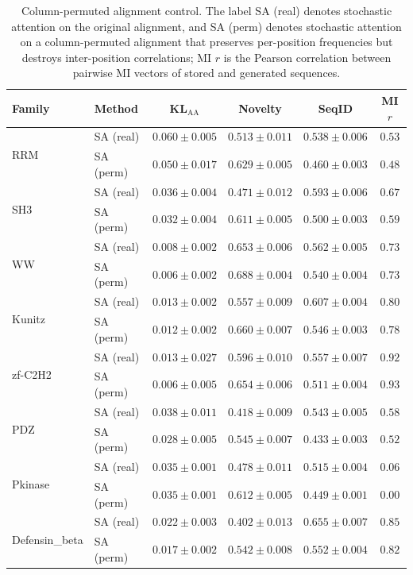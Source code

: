 \begin{table}[ht]
\centering
\caption{Column-permuted alignment control. The label SA (real) denotes stochastic attention on the original alignment, and SA (perm) denotes stochastic attention on a column-permuted alignment that preserves per-position frequencies but destroys inter-position correlations; MI $r$ is the Pearson correlation between pairwise MI vectors of stored and generated sequences.}
\label{tab:permuted-alignment}
\small
\begin{tabular}{@{}llcccc@{}}
\toprule
Family & Method & KL$_{\mathrm{AA}}$ & Novelty & SeqID & MI $r$ \\
\midrule
\multirow{2}{*}{RRM}
 & SA (real) & $0.060 \pm 0.005$ & $0.513 \pm 0.011$ & $0.538 \pm 0.006$ & $0.53$ \\
 & SA (perm) & $0.050 \pm 0.017$ & $0.629 \pm 0.005$ & $0.460 \pm 0.003$ & $0.48$ \\
\midrule
\multirow{2}{*}{SH3}
 & SA (real) & $0.036 \pm 0.004$ & $0.471 \pm 0.012$ & $0.593 \pm 0.006$ & $0.67$ \\
 & SA (perm) & $0.032 \pm 0.004$ & $0.611 \pm 0.005$ & $0.500 \pm 0.003$ & $0.59$ \\
\midrule
\multirow{2}{*}{WW}
 & SA (real) & $0.008 \pm 0.002$ & $0.653 \pm 0.006$ & $0.562 \pm 0.005$ & $0.73$ \\
 & SA (perm) & $0.006 \pm 0.002$ & $0.688 \pm 0.004$ & $0.540 \pm 0.004$ & $0.73$ \\
\midrule
\multirow{2}{*}{Kunitz}
 & SA (real) & $0.013 \pm 0.002$ & $0.557 \pm 0.009$ & $0.607 \pm 0.004$ & $0.80$ \\
 & SA (perm) & $0.012 \pm 0.002$ & $0.660 \pm 0.007$ & $0.546 \pm 0.003$ & $0.78$ \\
\midrule
\multirow{2}{*}{zf-C2H2}
 & SA (real) & $0.013 \pm 0.027$ & $0.596 \pm 0.010$ & $0.557 \pm 0.007$ & $0.92$ \\
 & SA (perm) & $0.006 \pm 0.005$ & $0.654 \pm 0.006$ & $0.511 \pm 0.004$ & $0.93$ \\
\midrule
\multirow{2}{*}{PDZ}
 & SA (real) & $0.038 \pm 0.011$ & $0.418 \pm 0.009$ & $0.543 \pm 0.005$ & $0.58$ \\
 & SA (perm) & $0.028 \pm 0.005$ & $0.545 \pm 0.007$ & $0.433 \pm 0.003$ & $0.52$ \\
\midrule
\multirow{2}{*}{Pkinase}
 & SA (real) & $0.035 \pm 0.001$ & $0.478 \pm 0.011$ & $0.515 \pm 0.004$ & $0.06$ \\
 & SA (perm) & $0.035 \pm 0.001$ & $0.612 \pm 0.005$ & $0.449 \pm 0.001$ & $0.00$ \\
\midrule
\multirow{2}{*}{Defensin\_beta}
 & SA (real) & $0.022 \pm 0.003$ & $0.402 \pm 0.013$ & $0.655 \pm 0.007$ & $0.85$ \\
 & SA (perm) & $0.017 \pm 0.002$ & $0.542 \pm 0.008$ & $0.552 \pm 0.004$ & $0.82$ \\
\bottomrule
\end{tabular}
\end{table}

